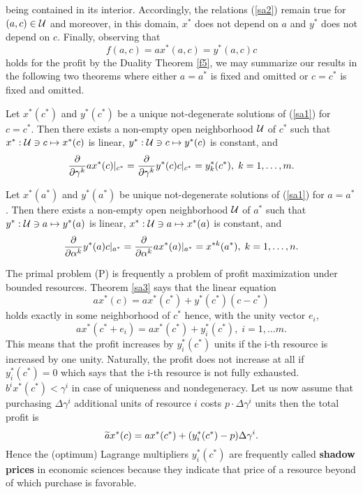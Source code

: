 being contained in its interior.  Accordingly, the relations (\ref{sa2}) remain
true for $(a,c) \in {\cal U}$ and moreover, in this domain, $x^*$ does not depend on
$a$ and $y^*$ does not depend on $c$.  Finally, observing that
\[
f(a,c) = ax^*(a,c) = y^*(a,c)c
\]
holds for the profit by the Duality Theorem \ref{f5}, we may summarize our
results in the following two theorems where either $a = a^*$ is fixed and
omitted or $c = c^*$ is fixed and omitted.
%
\begin{theorem} \label{sa3}
Let $x^*(c^*)$ and $y^*(c^*)$ be a unique not-degenerate solutions of
(\ref{sa1}) for $c = c^*$.  Then there exists a non-empty open neighborhood
$\cal U$ of $c^*$ such that $x^*:{\cal U} \ni c \mapsto x^*(c)$ is linear,
$y^*:  {\cal U} \ni c \mapsto y^*(c)$ is constant, and
\[
\displaystyle \frac{\partial}{\partial \gamma ^k}ax^*(c)|_{c^*}
= \frac{\partial}{\partial \gamma ^k}y^*(c)c|_{c^*} = y^*_k(c^*),
\; k = 1, \ldots , m.
\]
\end{theorem}
%
\begin{theorem} \label{sa4}
Let $x^*(a^*)$ and $y^*(a^*)$ be unique not-degenerate solutions of (\ref{sa1})
for $a = a^*$.  Then there exists a non-empty open neighborhood $\cal U$ of
$a^*$ such that $y^*:{\cal U} \ni a \mapsto y^*(a)$ is linear, $x^*:  {\cal
U} \ni a \mapsto x^*(a)$ is constant, and
\[
\displaystyle \frac{\partial}{\partial \alpha ^k}y^*(a)c|_{a^*}
= \frac{\partial}{\partial \alpha ^k}ax^*(a)|_{a^*} = x^{*k}(a^*),
\; k = 1, \ldots , n.
\]
\end{theorem}
%
%
The primal problem (P) is frequently a problem of profit maximization under\\
bounded resources. Theorem \ref{sa3} says that the linear equation
\[
ax^*(c) = ax^*(c^*) + y^*(c^*)(c - c^*)
\]
holds exactly in some neighborhood of $c^*$ hence, with the unity vector
$e_i$,
\[
ax^*(c^* + e_i) = ax^*(c^*) + y^*_i(c^*), \; i = 1, \ldots m.
\]
This means that the profit increases by $y^*_i(c^*)$ units if the i-th resource
is increased by one unity.  Naturally, the profit does not increase at all if
$y^*_i(c^*) = 0$ which says that the i-th resource is not fully exhausted.
$b^ix^*(c^*) < \gamma ^i$ in case of uniqueness and nondegeneracy.  Let us now
assume that purchasing $\Delta \gamma ^i$ additional units of resource $i$
costs $p\cdot \Delta \gamma ^i$ units then the total profit is
\[
\widetilde{a}x^*(c) = ax^*(c^*) + (y^*_i(c^*) - p)\Delta \gamma ^i.
\]
Hence the (optimum) {\sc Lagrange} multipliers $y^*_i(c^*)$ are frequently
called {\bf shadow prices} in economic sciences because they indicate that
price of a resource beyond of which purchase is favorable.

